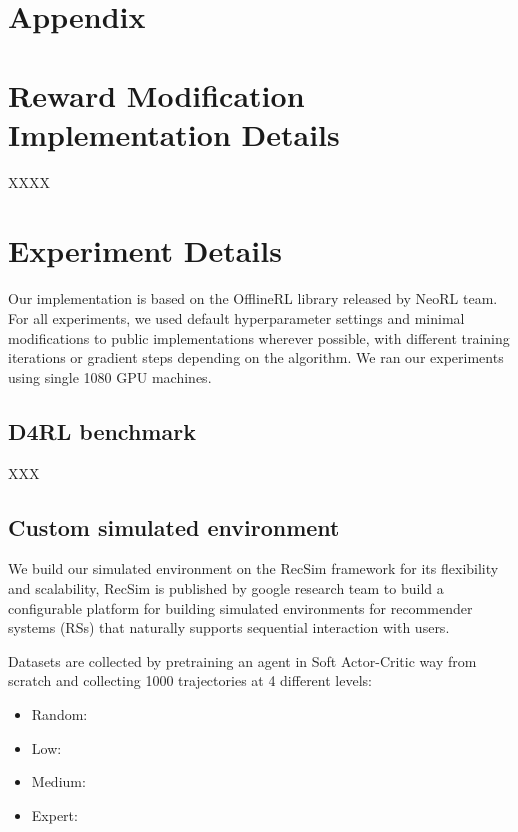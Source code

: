 \section*{Appendix}

\section{Reward Modification Implementation Details}
\label{appendix: rm_imp_details}
XXXX

\section{Experiment Details}
\label{appendix: exp_details}
Our implementation is based on the OfflineRL library released by NeoRL team.
For all experiments, we used default hyperparameter settings and minimal 
modifications to public implementations wherever possible, with different 
training iterations or gradient steps depending on the algorithm. We ran our 
experiments using single 1080 GPU machines.

\subsection{D4RL benchmark}\label{appendix: exp_d4rl_details}
XXX

\subsection{Custom simulated environment}\label{appendix: exp_custom_detials}
We build our simulated environment on the RecSim framework for its flexibility and scalability, RecSim is published by 
google research team to build a configurable platform for building simulated environments 
for recommender systems (RSs) that naturally supports sequential interaction with users.

Datasets are collected by pretraining an agent in Soft Actor-Critic way from scratch and collecting 1000 trajectories at 4 different levels:

\begin{itemize}
    \item Random: 
    \item Low: 
    \item Medium: 
    \item Expert:
\end{itemize}

